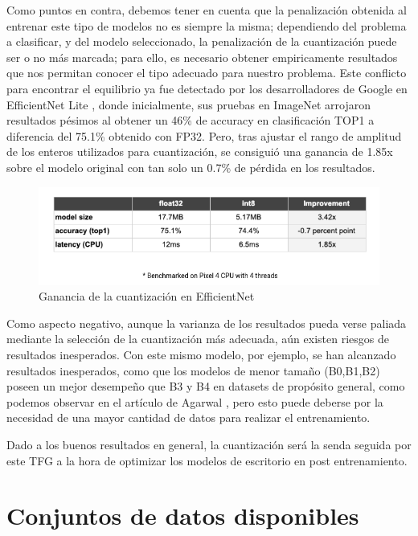 Como puntos en contra, debemos tener en cuenta que la penalización obtenida al entrenar este tipo de modelos no es siempre la misma; dependiendo del problema a clasificar, y del modelo seleccionado, la penalización de la cuantización puede ser o no más marcada; para ello, es necesario obtener empiricamente resultados que nos permitan conocer el tipo adecuado para nuestro problema. Este conflicto para encontrar el equilibrio ya fue detectado por los desarrolladores de Google en EfficientNet Lite \cite{eflite,eflite2}, donde inicialmente, sus pruebas en ImageNet arrojaron resultados pésimos al obtener un 46\% de accuracy en clasificación TOP1 a diferencia del 75.1\% obtenido con FP32. Pero, tras ajustar el rango de amplitud de los enteros utilizados para cuantización, se consiguió una ganancia de 1.85x sobre el modelo original con tan solo un 0.7\% de pérdida en los resultados.

\begin{figure}[H]
	\label{gananciacuant}
	\centering
	\includegraphics[scale = 0.35]{imagenes/gananciacuant.png}
	\caption{Ganancia de la cuantización en EfficientNet}
\end{figure}

Como aspecto negativo, aunque la varianza de los resultados pueda verse paliada mediante la selección de la cuantización más adecuada, aún existen riesgos de resultados inesperados. Con este mismo modelo, por ejemplo, se han alcanzado resultados inesperados, como que los modelos de menor tamaño (B0,B1,B2) poseen un mejor desempeño que B3 y B4 en datasets de propósito general, como podemos observar en el artículo de Agarwal  \cite{}, pero esto puede deberse por la necesidad de una mayor cantidad de datos para realizar el entrenamiento.

Dado a los buenos resultados en general, la cuantización será la senda seguida por este TFG a la hora de optimizar los modelos de escritorio en post entrenamiento.


\newpage
\section{Conjuntos de datos disponibles}

